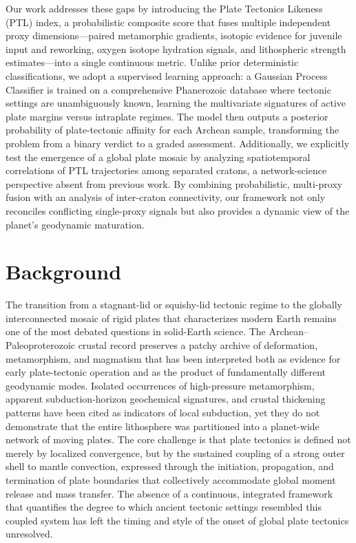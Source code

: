 \documentclass{article}
\begin{document}
Our work addresses these gaps by introducing the Plate Tectonics Likeness (PTL) index, a probabilistic composite score that fuses multiple independent proxy dimensions—paired metamorphic gradients, isotopic evidence for juvenile input and reworking, oxygen isotope hydration signals, and lithospheric strength estimates—into a single continuous metric. Unlike prior deterministic classifications, we adopt a supervised learning approach: a Gaussian Process Classifier is trained on a comprehensive Phanerozoic database where tectonic settings are unambiguously known, learning the multivariate signatures of active plate margins versus intraplate regimes. The model then outputs a posterior probability of plate-tectonic affinity for each Archean sample, transforming the problem from a binary verdict to a graded assessment. Additionally, we explicitly test the emergence of a global plate mosaic by analyzing spatiotemporal correlations of PTL trajectories among separated cratons, a network-science perspective absent from previous work. By combining probabilistic, multi-proxy fusion with an analysis of inter-craton connectivity, our framework not only reconciles conflicting single-proxy signals but also provides a dynamic view of the planet’s geodynamic maturation.

\section{Background}

The transition from a stagnant-lid or squishy-lid tectonic regime to the globally interconnected mosaic of rigid plates that characterizes modern Earth remains one of the most debated questions in solid-Earth science. The Archean–Paleoproterozoic crustal record preserves a patchy archive of deformation, metamorphism, and magmatism that has been interpreted both as evidence for early plate-tectonic operation and as the product of fundamentally different geodynamic modes. Isolated occurrences of high-pressure metamorphism, apparent subduction-horizon geochemical signatures, and crustal thickening patterns have been cited as indicators of local subduction, yet they do not demonstrate that the entire lithosphere was partitioned into a planet-wide network of moving plates. The core challenge is that plate tectonics is defined not merely by localized convergence, but by the sustained coupling of a strong outer shell to mantle convection, expressed through the initiation, propagation, and termination of plate boundaries that collectively accommodate global moment release and mass transfer. The absence of a continuous, integrated framework that quantifies the degree to which ancient tectonic settings resembled this coupled system has left the timing and style of the onset of global plate tectonics unresolved.
\end{document}
